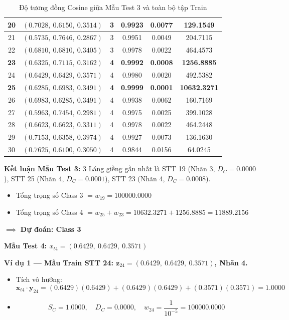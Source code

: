 \documentclass[12pt,a4paper]{article}
\begin{document}
\begin{table}[H]
{\begin{tabular}{|c|c|c|c|c|c|}
20 & $(0.7028,\ 0.6150,\ 0.3514)$ & 3 & 0.9923 & 0.0077 & 129.1549 \\ \hline
21 & $(0.5735,\ 0.7646,\ 0.2867)$ & 3 & 0.9951 & 0.0049 & 204.7115 \\ \hline
22 & $(0.6810,\ 0.6810,\ 0.3405)$ & 3 & 0.9978 & 0.0022 & 464.4573 \\ \hline
\textbf{23} & \textbf{$(0.6325,\ 0.7115,\ 0.3162)$} & \textbf{4} & \textbf{0.9992} & \textbf{0.0008} & \textbf{1256.8885} \\ \hline
24 & $(0.6429,\ 0.6429,\ 0.3571)$ & 4 & 0.9980 & 0.0020 & 492.5382 \\ \hline
\textbf{25} & \textbf{$(0.6285,\ 0.6983,\ 0.3491)$} & \textbf{4} & \textbf{0.9999} & \textbf{0.0001} & \textbf{10632.3271} \\ \hline
26 & $(0.6983,\ 0.6285,\ 0.3491)$ & 4 & 0.9938 & 0.0062 & 160.7169 \\ \hline
27 & $(0.5963,\ 0.7454,\ 0.2981)$ & 4 & 0.9975 & 0.0025 & 399.1028 \\ \hline
28 & $(0.6623,\ 0.6623,\ 0.3311)$ & 4 & 0.9978 & 0.0022 & 464.2448 \\ \hline
29 & $(0.7153,\ 0.6358,\ 0.3974)$ & 4 & 0.9927 & 0.0073 & 136.1630 \\ \hline
30 & $(0.7625,\ 0.6100,\ 0.3050)$ & 4 & 0.9844 & 0.0156 & 64.0245 \\ \hline
\end{tabular}%
}
\caption{Độ tương đồng Cosine giữa Mẫu Test 3 và toàn bộ tập Train}
\end{table}
 
\textbf{Kết luận Mẫu Test 3:} 3 Láng giềng gần nhất là STT 19 (Nhãn 3, $D_C=0.0000$), STT 25 (Nhãn 4, $D_C=0.0001$), STT 23 (Nhãn 4, $D_C=0.0008$).
\begin{itemize}
    \item Tổng trọng số Class 3 $= w_{19} = 100000.0000$
    \item Tổng trọng số Class 4 $= w_{25} + w_{23} = 10632.3271 + 1256.8885 = 11889.2156$
\end{itemize}
$\implies$ \textbf{Dự đoán: Class 3}
 
\vspace{0.5cm}
 
\textbf{Mẫu Test 4: $x_{t4} = (0.6429,\ 0.6429,\ 0.3571)$}
 
\vspace{0.3cm}
\textbf{Ví dụ 1 — Mẫu Train STT 24: $\mathbf{z}_{24} = (0.6429,\ 0.6429,\ 0.3571)$, Nhãn 4.}
\begin{itemize}
    \item Tích vô hướng:
    \[
        \mathbf{x}_{t4} \cdot \mathbf{y}_{24}
        = (0.6429)(0.6429) + (0.6429)(0.6429) + (0.3571)(0.3571) = 1.0000
    \]
    \item
    \[
        S_C = 1.0000, \quad D_C = 0.0000, \quad
        w_{24} = \frac{1}{10^{-5}} = 100000.0000
    \]
\end{itemize}
 
\end{document}
